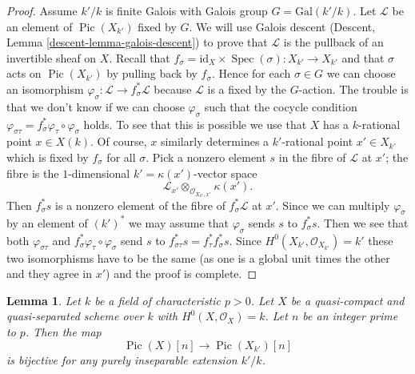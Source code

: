 \documentclass{stacks-project}
\theoremstyle{plain}
\newtheorem{lemma}[subsection]{Lemma}
\theoremstyle{definition}
\theoremstyle{remark}
\numberwithin{equation}{subsection}
\def\Spec{\mathop{\mathrm{Spec}}}
\def\Pic{\mathop{\mathrm{Pic}}\nolimits}
\begin{document}
\begin{proof}
\medskip\noindent
Assume $k'/k$ is finite Galois with Galois group $G = \text{Gal}(k'/k)$.
Let $\mathcal{L}$ be an element of $\Pic(X_{k'})$ fixed by $G$.
We will use Galois descent (Descent, Lemma \ref{descent-lemma-galois-descent})
to prove that $\mathcal{L}$ is the pullback of an invertible sheaf on $X$.
Recall that $f_\sigma = \text{id}_X \times \Spec(\sigma) : X_{k'} \to X_{k'}$
and that $\sigma$ acts on $\Pic(X_{k'})$ by pulling back by $f_\sigma$.
Hence for each $\sigma \in G$ we can choose an isomorphism
$\varphi_\sigma : \mathcal{L} \to f_\sigma^*\mathcal{L}$
because $\mathcal{L}$ is a fixed by the $G$-action.
The trouble is that we don't know if we can choose
$\varphi_\sigma$ such that the cocycle condition
$\varphi_{\sigma\tau} = f_\sigma^*\varphi_\tau \circ \varphi_\sigma$
holds. To see that this is possible we use that $X$ has a $k$-rational point
$x \in X(k)$. Of course, $x$ similarly determines a $k'$-rational point
$x' \in X_{k'}$ which is fixed by $f_\sigma$ for all $\sigma$.
Pick a nonzero element $s$ in the fibre of $\mathcal{L}$ at $x'$;
the fibre is the $1$-dimensional $k' = \kappa(x')$-vector space
$$
\mathcal{L}_{x'} \otimes_{\mathcal{O}_{X_{k'}, x'}} \kappa(x').
$$
Then $f_\sigma^*s$ is a nonzero element of the fibre of
$f_\sigma^*\mathcal{L}$ at $x'$. Since we can multiply $\varphi_\sigma$
by an element of $(k')^*$ we may assume that $\varphi_\sigma$ sends
$s$ to $f_\sigma^*s$. Then we see that both $\varphi_{\sigma\tau}$ and
$f_\sigma^*\varphi_\tau \circ \varphi_\sigma$
send $s$ to $f_{\sigma\tau}^*s = f_\tau^*f_\sigma^*s$.
Since $H^0(X_{k'}, \mathcal{O}_{X_{k'}}) = k'$ these two isomorphisms
have to be the same (as one is a global unit times the other
and they agree in $x'$) and the proof is complete.
\end{proof}

\begin{lemma}
\label{lemma-torsion-descends}
Let $k$ be a field of characteristic $p > 0$. Let $X$ be a
quasi-compact and quasi-separated scheme over $k$ with
$H^0(X, \mathcal{O}_X) = k$. Let $n$ be an integer prime to $p$.
Then the map
$$
\Pic(X)[n] \longrightarrow \Pic(X_{k'})[n]
$$
is bijective for any purely inseparable extension $k'/k$.
\end{lemma}
\end{document}
